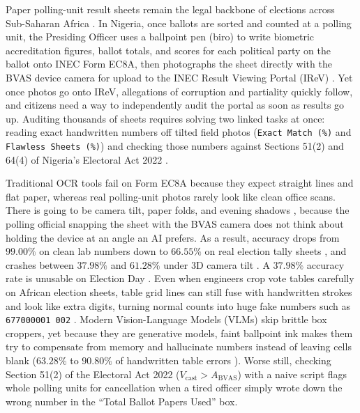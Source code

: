 \documentclass{article}
\begin{document}
Paper polling-unit result sheets remain the legal backbone of elections across Sub-Saharan Africa \cite{inec2022electoral,kimani2022using,veza2024inec}. In Nigeria, once ballots are sorted and counted at a polling unit, the Presiding Officer uses a ballpoint pen (biro) to write biometric accreditation figures, ballot totals, and scores for each political party on the ballot onto INEC Form EC8A, then photographs the sheet directly with the BVAS device camera for upload to the INEC Result Viewing Portal (IReV) \cite{inec2022electoral,veza2024inec,uwakwe2026ai}. Yet once photos go onto IReV, allegations of corruption and partiality quickly follow, and citizens need a way to independently audit the portal as soon as results go up. Auditing thousands of sheets requires solving two linked tasks at once: reading exact handwritten numbers off tilted field photos (\texttt{Exact Match (\%)} and \texttt{Flawless Sheets (\%)}) and checking those numbers against Sections 51(2) and 64(4) of Nigeria's Electoral Act 2022 \cite{inec2022electoral,young2026irevsentinel}.

Traditional OCR tools \cite{lecun1998gradient,li2023trocr,ouyang2025omnidocbench} fail on Form EC8A because they expect straight lines and flat paper, whereas real polling-unit photos rarely look like clean office scans. There is going to be camera tilt, paper folds, and evening shadows \cite{veza2024inec,icie2026shadow}, because the polling official snapping the sheet with the BVAS camera does not think about holding the device at an angle an AI prefers. As a result, accuracy drops from $99.00\%$ on clean lab numbers down to $66.55\%$ on real election tally sheets \cite{gondere2016election}, and crashes between $37.98\%$ and $61.28\%$ under 3D camera tilt \cite{zhou2026real5omnidocbench}. A $37.98\%$ accuracy rate is unusable on Election Day \cite{zhou2026real5omnidocbench}. Even when engineers crop vote tables carefully on African election sheets, table grid lines can still fuse with handwritten strokes and look like extra digits, turning normal counts into huge fake numbers such as \texttt{677000001 002} \cite{kimani2022using}. Modern Vision-Language Models (VLMs) \cite{bai2025qwen25vl,fu2025ocrbenchv2,alkhaled2025benchmarking,poznanski2025olmocr} skip brittle box croppers, yet because they are generative models, faint ballpoint ink makes them try to compensate from memory and hallucinate numbers instead of leaving cells blank ($63.28\%$ to $90.80\%$ of handwritten table errors \cite{zhang2026wildhandbench,koncile2025ocr}). Worse still, checking Section 51(2) of the Electoral Act 2022 ($V_{\text{cast}} > A_{\text{BVAS}}$) \cite{inec2022electoral} with a naive script flags whole polling units for cancellation when a tired officer simply wrote down the wrong number in the ``Total Ballot Papers Used'' box.
\end{document}
